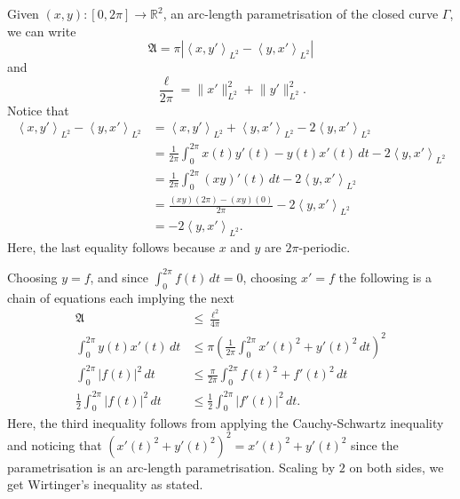 \documentclass[12 pt, letterpaper]{hmcpset}
\begin{document}
\begin{solution}
	Given $(x, y) : [0, 2 \pi] \to \mathbb{R}^{2}$, an arc-length parametrisation of the closed curve $\Gamma$, we can write
	\[
		\mathfrak{A} = \pi \left \lvert \left < x, y' \right >_{L^{2}} - \left < y, x' \right >_{L^{2}} \right \rvert
	\]
	and
	\[
		\frac{\ell}{2 \pi} = \lVert x' \rVert_{L^{2}}^{2} + \lVert y' \rVert_{L^{2}}^{2}.
	\]
	Notice that
	\begin{align*}
		\left < x, y' \right >_{L^{2}} - \left < y, x' \right >_{L^{2}} & = \left < x, y' \right >_{L^{2}} + \left < y, x' \right >_{L^{2}} - 2 \left < y, x' \right >_{L^{2}} \\
										& = \frac{1}{2 \pi} \int_{0}^{2 \pi} x(t) y'(t) - y(t) x'(t) \, dt - 2 \left < y, x' \right >_{L^{2}} \\
										& = \frac{1}{2 \pi} \int_{0}^{2 \pi} (x y)'(t) \, dt - 2 \left < y, x' \right >_{L^{2}} \\
										& = \frac{(xy)(2 \pi) - (xy)(0)}{2 \pi} - 2 \left < y, x' \right >_{L^{2}} \\
										& = - 2 \left < y, x' \right >_{L^{2}}.
	\end{align*}
	Here, the last equality follows because $x$ and $y$ are $2 \pi$-periodic.

	Choosing $y = f$, and since $\int_{0}^{2 \pi} f(t) \, dt = 0$, choosing $x' = f$ the following is a chain of equations each implying the next
	\begin{align*}
		\mathfrak{A} & \le \frac{\ell^{2}}{4 \pi} \\
		\int_{0}^{2 \pi} y(t) x'(t) \, dt & \le \pi \left ( \frac{1}{2 \pi}  \int_{0}^{2 \pi} x'(t)^{2} + y'(t)^{2} \, dt \right )^{2} \\
		\int_{0}^{2 \pi} \lvert f(t) \rvert^{2} \, dt & \le \frac{\pi}{2 \pi} \int_{0}^{2 \pi} f(t)^{2} + f'(t)^{2} \, dt \\
		\frac{1}{2} \int_{0}^{2 \pi} \lvert f(t) \rvert^{2} \, dt & \le \frac{1}{2} \int_{0}^{2 \pi} \lvert f'(t) \rvert^{2} \, dt.
	\end{align*}
	Here, the third inequality follows from applying the Cauchy-Schwartz inequality and noticing that $(x'(t)^{2} + y'(t)^{2})^{2} = x'(t)^{2} + y'(t)^{2}$ since the parametrisation is an arc-length parametrisation. Scaling by $2$ on both sides, we get Wirtinger's inequality as stated.


\end{solution}
\end{document}
